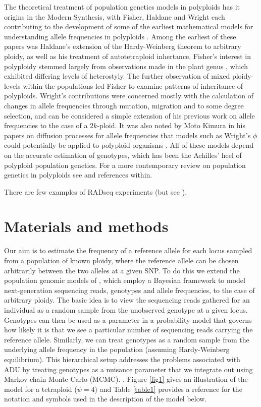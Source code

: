 \documentclass[11pt,english,letterpaper,oneside]{article}
\begin{document}
The theoretical treatment of population genetics models in polyploids has it origins in the Modern Synthesis, with  Fisher, Haldane and Wright each contributing to the development of some of the earliest mathematical models for understanding allele frequencies in polyploids \citep{haldane1930autopolyploids,wright1938polyploid,}. Among the earliest of these papers was Haldane's extension of the Hardy-Weinberg theorem to arbitrary ploidy, as well as his treatment of autotetraploid inhertance. Fisher's interest in polyploidy stemmed largely from observations made in the plant genus , which exhibited differing levels of heterostyly. The further observation of mixed ploidy-levels within the populations led Fisher to examine patterns of inheritance of polyploids. Wright's contributions were concerned mostly with the calculation of changes in allele frequencies through mutation, migration and to some degree selection, and can be considered a simple extension of his previous work on allele frequencies to the case of a $2k$-ploid. \cite{moody1993autopolyploids} It was also noted by Moto Kimura in his papers on diffusion processes for allele frequencies that models such as Wright's $\phi$ could potentially be applied to polyploid organisms \citep{kimura1964diffusion}. All of these models depend on the accurate estimation of genotypes, which has been the Achilles' heel of polyploid population genetics. For a more contemporary review on population genetics in polyploids see \cite{dufresne2014polyPopGen} and references within.
\medskip

There are few examples of RADseq experiments (but see \citep{logan-young2015polyploidSNP}).
\medskip

\section*{Materials and methods}                  %

\noindent Our aim is to estimate the frequency of a reference allele for each locus sampled from a population of known ploidy, where the reference allele can be chosen arbitrarily between the two alleles at a given SNP. To do this we extend the population genomic models of \cite{buerkle2013popModels}, which employ a Bayesian framework to model next-generation sequencing reads, genotypes and allele frequencies, to the case of arbitrary ploidy. The basic idea is to view the sequencing reads gathered for an individual as a random sample from the unobserved genotype at a given locus. Genotypes can then be used as a parameter in a probability model that governs how likely it is that we see a particular number of sequencing reads carrying the reference allele. Similarly, we can treat genotypes as a random sample from the underlying allele frequency in the population (assuming Hardy-Weinberg equilibrium). This hierarchical setup addresses the problems associated with ADU by treating genotypes as a nuisance parameter that we integrate out using Markov chain Monte Carlo (MCMC). . Figure \ref{fig1} gives an illustration of the model for a tetraploid ($\psi=4$) and Table \ref{table1} provides a reference for the notation and symbols used in the description of the model below.
\end{document}
